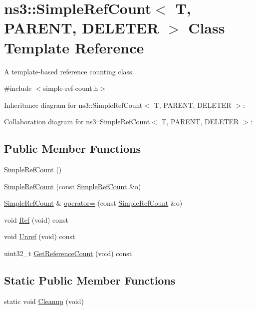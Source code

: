 \hypertarget{classns3_1_1SimpleRefCount}{}\section{ns3\+:\+:Simple\+Ref\+Count$<$ T, P\+A\+R\+E\+NT, D\+E\+L\+E\+T\+ER $>$ Class Template Reference}
\label{classns3_1_1SimpleRefCount}


A template-\/based reference counting class.  




{\ttfamily \#include $<$simple-\/ref-\/count.\+h$>$}



Inheritance diagram for ns3\+:\+:Simple\+Ref\+Count$<$ T, P\+A\+R\+E\+NT, D\+E\+L\+E\+T\+ER $>$\+:


Collaboration diagram for ns3\+:\+:Simple\+Ref\+Count$<$ T, P\+A\+R\+E\+NT, D\+E\+L\+E\+T\+ER $>$\+:
\subsection*{Public Member Functions}
\begin{DoxyCompactItemize}
\item 
\hyperlink{classns3_1_1SimpleRefCount_a63d5f45f3abdac2f6766eded32e37e93}{Simple\+Ref\+Count} ()
\item 
\hyperlink{classns3_1_1SimpleRefCount_ac8002cfa9c03b4cae0e0ac38a78cc931}{Simple\+Ref\+Count} (const \hyperlink{classns3_1_1SimpleRefCount}{Simple\+Ref\+Count} \&o)
\item 
\hyperlink{classns3_1_1SimpleRefCount}{Simple\+Ref\+Count} \& \hyperlink{classns3_1_1SimpleRefCount_aabdd2ee9bd71a8d7b886cd570a7ffdad}{operator=} (const \hyperlink{classns3_1_1SimpleRefCount}{Simple\+Ref\+Count} \&o)
\item 
void \hyperlink{classns3_1_1SimpleRefCount_ab7545a4e56ceef44cb91e2bbf0f26f18}{Ref} (void) const 
\item 
void \hyperlink{classns3_1_1SimpleRefCount_aeb8f59b2f744915a64a2271c9e4b5ec0}{Unref} (void) const 
\item 
uint32\+\_\+t \hyperlink{classns3_1_1SimpleRefCount_a05378396c93bcc7d6bf78a9ee9ae9cca}{Get\+Reference\+Count} (void) const 
\end{DoxyCompactItemize}
\subsection*{Static Public Member Functions}
\begin{DoxyCompactItemize}
\item 
static void \hyperlink{classns3_1_1SimpleRefCount_aa2018cc60e813893af32650e1e37a857}{Cleanup} (void)
\end{DoxyCompactItemize}
